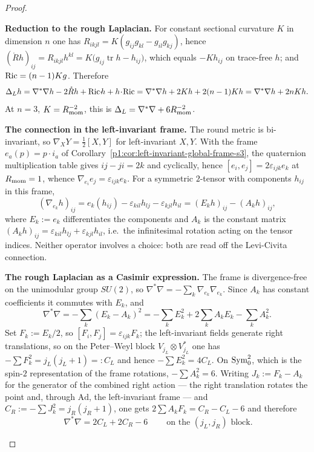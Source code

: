 \documentclass[11pt]{article}
\begin{document}
\begin{proof}

\begin{proofsteps}
\item \textbf{Reduction to the rough Laplacian.}
For constant sectional curvature \(K\) in dimension \(n\) one has
\(R_{ikjl}=K(g_{ij}g_{kl}-g_{il}g_{kj})\), hence
\((\mathring Rh)_{ij}=R_{ikjl}h^{kl}=K\bigl(g_{ij}\operatorname{tr}h-h_{ij}\bigr)\),
which equals \(-Kh_{ij}\) on trace-free \(h\); and \(\operatorname{Ric}=(n-1)Kg\).  Therefore
\[
  \Delta_Lh=\nabla^*\nabla h-2\mathring Rh+\operatorname{Ric}\!\cdot\!h+h\!\cdot\!\operatorname{Ric}
  =\nabla^*\nabla h+2Kh+2(n-1)Kh
  =\nabla^*\nabla h+2nKh .
\]
At \(n=3\), \(K=R_{\mathrm{mom}}^{-2}\), this is \(\Delta_L=\nabla^*\nabla+6R_{\mathrm{mom}}^{-2}\).

\item \textbf{The connection in the left-invariant frame.}
The round metric is bi-invariant, so \(\nabla_XY=\tfrac12[X,Y]\) for
left-invariant \(X,Y\).  With the frame
\(e_a(p)=p\cdot i_a\) of
Corollary~\ref{p1:cor:left-invariant-global-frame-s3}, the quaternion
multiplication table gives \(ij-ji=2k\) and cyclically, hence
\([e_i,e_j]=2\varepsilon_{ijk}e_k\) at \(R_{\mathrm{mom}}=1\), whence
\(\nabla_{e_i}e_j=\varepsilon_{ijk}e_k\).  For a symmetric
\(2\)-tensor with components \(h_{ij}\) in this frame,
\[
  (\nabla_{e_k}h)_{ij}
  =e_k(h_{ij})-\varepsilon_{kil}h_{lj}-\varepsilon_{kjl}h_{il}
  =(E_kh)_{ij}-(A_kh)_{ij},
\]
where \(E_k:=e_k\) differentiates the components and \(A_k\) is the constant
matrix \((A_kh)_{ij}=\varepsilon_{kil}h_{lj}+\varepsilon_{kjl}h_{il}\), i.e.\ the
infinitesimal rotation acting on the tensor indices.  Neither operator involves
a choice: both are read off the Levi-Civita connection.

\item \textbf{The rough Laplacian as a Casimir expression.}
The frame is divergence-free on the unimodular group \(SU(2)\), so
\(\nabla^*\nabla=-\sum_k\nabla_{e_k}\nabla_{e_k}\).  Since \(A_k\) has constant
coefficients it commutes with \(E_k\), and
\[
  \nabla^*\nabla
  =-\sum_k(E_k-A_k)^2
  =-\sum_kE_k^2+2\sum_kA_kE_k-\sum_kA_k^2 .
\]
Set \(F_k:=E_k/2\), so \([F_i,F_j]=\varepsilon_{ijk}F_k\); the left-invariant
fields generate right translations, so on the Peter--Weyl block
\(V_{j_L}\otimes V_{j_L}^*\) one has \(-\sum F_k^2=j_L(j_L+1)=:C_L\) and hence
\(-\sum E_k^2=4C_L\).  On \(\operatorname{Sym}^2_0\), which is the spin-\(2\) representation
of the frame rotations, \(-\sum A_k^2=6\).  Writing \(J_k:=F_k-A_k\) for the
generator of the combined right action --- the right translation rotates the
point and, through \(\mathrm{Ad}\), the left-invariant frame --- and
\(C_R:=-\sum J_k^2=j_R(j_R+1)\), one gets
\(2\sum A_kF_k=C_R-C_L-6\) and therefore
\[
  \boxed{\ \nabla^*\nabla=2C_L+2C_R-6\ }
  \qquad\text{on the }(j_L,j_R)\text{ block.}
\]


\end{proofsteps}
\end{proof}
\end{document}
